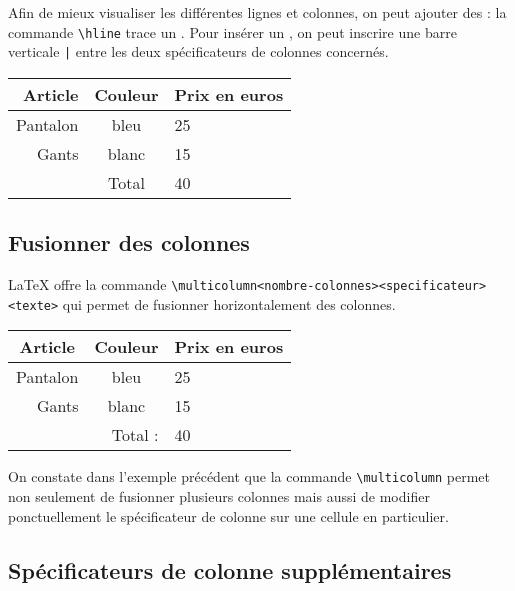 Afin de mieux visualiser les différentes lignes et colonnes, on peut ajouter des  : la commande \verb!\hline! trace un .
Pour insérer un , on peut inscrire une barre verticale \verb!|! entre les deux spécificateurs de colonnes concernés.\bigskip


\begin{SideBySideExample}
    \begin{tabular}{r||c|l}
        Article & Couleur & Prix en euros \\ \hline\hline
        Pantalon & bleu & 25 \\
        Gants & blanc & 15 \\ \hline
          & Total & 40
    \end{tabular}
\end{SideBySideExample}


\subsection{Fusionner des colonnes}

\LaTeX{} offre la commande \texttt{\textbackslash multicolumn}\texttt{<nombre-colonnes>}\texttt{<specificateur>}\texttt{<texte>} qui permet de fusionner horizontalement des colonnes.\bigskip

\begin{SideBySideExample}
    \begin{tabular}{r|c|l}
        \multicolumn{1}{c|}{Article} &
        Couleur & Prix en euros \\ \hline
        Pantalon & bleu & 25 \\
        Gants & blanc & 15 \\ \hline
        \multicolumn{2}{r}{Total :} & 40
    \end{tabular}
\end{SideBySideExample}
\bigskip

\begin{info}
    On constate dans l'exemple précédent que la commande \texttt{\textbackslash multicolumn} permet non seulement de fusionner plusieurs colonnes mais aussi de modifier ponctuellement le spécificateur de colonne sur une cellule en particulier.
\end{info}

\subsection{Spécificateurs de colonne supplémentaires}

